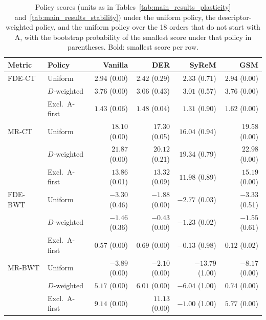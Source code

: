 \begin{table}[!t]
\centering
\caption{Policy scores (units as in Tables~\ref{tab:main_results_plasticity} and~\ref{tab:main_results_stability}) under the uniform policy, the descriptor-weighted policy, and the uniform policy over the 18 orders that do not start with A, with the bootstrap probability of the smallest score under that policy in parentheses. Bold: smallest score per row.}
\label{tab:weighted_metrics}
\setlength{\tabcolsep}{1.5pt}
\scriptsize
\begin{tabular*}{\columnwidth}{@{\extracolsep{\fill}}llrrrr@{}}
\toprule
Metric & Policy & Vanilla & DER & SyReM & GSM \\
\midrule
FDE-CT & Uniform & $2.94$ (0.00) & $2.42$ (0.29) & {\boldmath$2.33$} (0.71) & $2.94$ (0.00) \\
 & $D$-weighted & $3.76$ (0.00) & $3.06$ (0.43) & {\boldmath$3.01$} (0.57) & $3.76$ (0.00) \\
 & Excl.\ A-first & $1.43$ (0.06) & $1.48$ (0.04) & {\boldmath$1.31$} (0.90) & $1.62$ (0.00) \\
\midrule
MR-CT & Uniform & $18.10$ (0.00) & $17.30$ (0.05) & {\boldmath$16.04$} (0.94) & $19.58$ (0.00) \\
 & $D$-weighted & $21.87$ (0.00) & $20.12$ (0.21) & {\boldmath$19.34$} (0.79) & $22.98$ (0.00) \\
 & Excl.\ A-first & $13.86$ (0.01) & $13.32$ (0.09) & {\boldmath$11.98$} (0.89) & $15.19$ (0.00) \\
\midrule
FDE-BWT & Uniform & $-3.30$ (0.46) & $-1.88$ (0.00) & $-2.77$ (0.03) & {\boldmath$-3.33$} (0.51) \\
 & $D$-weighted & $-1.46$ (0.36) & $-0.43$ (0.00) & $-1.23$ (0.02) & {\boldmath$-1.55$} (0.61) \\
 & Excl.\ A-first & $0.57$ (0.00) & $0.69$ (0.00) & {\boldmath$-0.13$} (0.98) & $0.12$ (0.02) \\
\midrule
MR-BWT & Uniform & $-3.89$ (0.00) & $-2.10$ (0.00) & {\boldmath$-13.79$} (1.00) & $-8.17$ (0.00) \\
 & $D$-weighted & $5.17$ (0.00) & $6.01$ (0.00) & {\boldmath$-6.04$} (1.00) & $0.74$ (0.00) \\
 & Excl.\ A-first & $9.14$ (0.00) & $11.13$ (0.00) & {\boldmath$-1.00$} (1.00) & $5.77$ (0.00) \\
\bottomrule
\end{tabular*}
\end{table}
